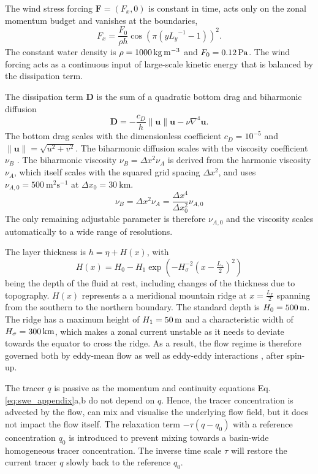The wind stress forcing $\mathbf{F} = (F_x,0)$ is constant in time, acts only on the zonal momentum budget
and vanishes at the boundaries,
\begin{equation}
F_x = \frac{F_0}{\rho h} \cos\left(\pi\left(y{L_y}^{-1} - 1\right)\right)^2.
\end{equation}
The constant water density is $\rho = 1000\operatorname{kg}\operatorname{m}^{-3}$ and $F_0 = 0.12\operatorname{Pa}$.
The wind forcing acts as a continuous input of large-scale kinetic energy that is balanced by the dissipation term.

The dissipation term $\mathbf{D}$ is the sum of a quadratic bottom drag and biharmonic diffusion
\begin{equation}
\mathbf{D} = -\frac{c_D}{h}\| \mathbf{u} \| \mathbf{u} - \nu \nabla^4 \mathbf{u}.
\label{eq:diss}
\end{equation}
The bottom drag scales with the dimensionless coefficient $c_D = 10^{-5}$ \citep{Arbic2008} and $\| \mathbf{u} \| = \sqrt{u^2 + v^2}$.
The biharmonic diffusion scales with the viscosity coefficient $\nu_B$ \citep{Griffies2000}. The biharmonic viscosity $\nu_B = \Delta x^2 \nu_A$
is derived from the harmonic viscosity $\nu_A$, which itself scales with the squared grid spacing $\Delta x^2$, and uses
$\nu_{A,0} = 500~\mathrm{m}^2\mathrm{s}^{-1}$ at $\Delta x_0 = 30~\mathrm{km}$.
\begin{equation}
\nu_B = \Delta x^2 \nu_A = \frac{\Delta x^4}{\Delta x_0^2} \nu_{A,0}
\end{equation}
The only remaining adjustable parameter is therefore $\nu_{A,0}$ and the viscosity scales automatically to a wide range of resolutions.

The layer thickness is $h = \eta + H(x)$, with
\begin{equation}
H(x) = H_0 - H_1\exp\left(-H_\sigma^{-2}(x-\tfrac{L_x}{2})^2\right)
\end{equation}
being the depth of the fluid at rest, including changes of the thickness due to topography. $H(x)$ represents a 
a meridional mountain ridge at $x=\tfrac{L_x}{2}$ spanning from the southern to the northern boundary.
The standard depth is $H_0 = 500\operatorname{m}$. The ridge has a maximum height of $H_1 = 50\operatorname{m}$
and a characteristic width of $H_\sigma = 300\operatorname{km}$, which makes a zonal current unstable as it needs to
deviate towards the equator to cross the ridge. As a result, the flow regime is therefore governed both by
eddy-mean flow as well as eddy-eddy interactions \citep{Ferrari2010}, after spin-up.

The tracer $q$ is passive as the momentum and continuity equations Eq. \ref{eq:swe_appendix}a,b do not depend on $q$. Hence,
the tracer concentration is advected by the flow, can mix and visualise the underlying flow field, but it does not impact the
flow itself. The relaxation term $-\tau(q-q_0)$ with a reference concentration $q_0$ is introduced to prevent mixing towards
a basin-wide homogeneous tracer concentration. The inverse time scale $\tau$ will restore the current tracer $q$ slowly
back to the reference $q_0$.

